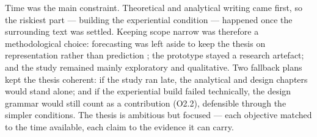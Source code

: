 Time was the main constraint. Theoretical and analytical writing came first, so the riskiest part --- building the experiential condition --- happened once the surrounding text was settled. Keeping scope narrow was therefore a methodological choice: forecasting was left aside to keep the thesis on representation rather than prediction \citep{sonnewald2021}; the prototype stayed a research artefact; and the study remained mainly exploratory and qualitative. Two fallback plans kept the thesis coherent: if the study ran late, the analytical and design chapters would stand alone; and if the experiential build failed technically, the design grammar would still count as a contribution (O2.2), defensible through the simpler conditions. The thesis is ambitious but focused --- each objective matched to the time available, each claim to the evidence it can carry.

